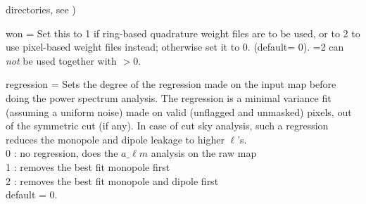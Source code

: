 \begin{qualifiers}
\begin{qulist}{}
directories, see )
\item[{won = }]%
 Set this to 1 if ring-based quadrature weight files are to be used,
 or to 2 to use pixel-based weight files instead;
otherwise set it to 0. (default= 0).
=2 can {\em not} be used together with $>0$.
\item[{regression = }]%
 {{Sets the degree of the regression made on the
input map before doing the power spectrum analysis. 
The regression is a minimal variance fit (assuming a uniform noise) 
made on valid (unflagged and unmasked) pixels, out of the symmetric cut (if
any). In case of cut sky analysis, such a regression reduces the monopole
and dipole leakage to higher $\ell$'s.\\
0 : no regression, does the $a\_{\ell m}$ analysis on the raw map\\
1 : removes the best fit monopole first\\
2 : removes the best fit monopole and dipole first\\
default = 0.}}
 
  \end{qulist}
\end{qualifiers}
\vfill

